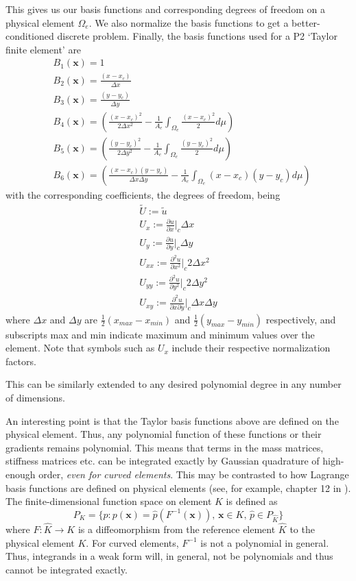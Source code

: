 \documentclass[11pt]{article}
\let\bld\boldsymbol
\begin{document}
This gives us our basis functions and corresponding degrees of freedom on a physical element $\Omega_e$. We also normalize the basis functions to get a better-conditioned discrete problem. Finally, the basis functions used for a P2 `Taylor finite element' are
\begin{align}
&B_1(\bld{x}) = 1 \\
&B_2(\bld{x}) = \frac{(x-x_c)}{\Delta x} \\
&B_3(\bld{x}) = \frac{(y-y_c)}{\Delta y} \\
&B_4(\bld{x}) = \left( \frac{(x-x_c)^2}{2\Delta x^2} - \frac{1}{A_e}\int_{\Omega_e} \frac{(x-x_c)^2}{2}d\mu \right) \\
&B_5(\bld{x}) = \left( \frac{(y-y_c)^2}{2\Delta y^2} -\frac{1}{A_e}\int_{\Omega_e} \frac{(y-y_c)^2}{2}d\mu \right) \\
&B_6(\bld{x}) = \left( \frac{(x-x_c)(y-y_c)}{\Delta x\Delta y} - \frac{1}{A_e}\int_{\Omega_e} (x-x_c)(y-y_c)d\mu \right)
\end{align}
with the corresponding coefficients, the degrees of freedom, being
\begin{align}
\tilde{U} := \tilde{u} \\
U_x := \frac{\partial u}{\partial x}\Big|_c \Delta x \\
U_y := \frac{\partial u}{\partial y}\Big|_c \Delta y \\
U_{xx} := \frac{\partial^2 u}{\partial x^2}\Big|_c 2\Delta x^2 \\
U_{yy} := \frac{\partial^2 u}{\partial y^2}\Big|_c 2\Delta y^2 \\
U_{xy} := \frac{\partial^2 u}{\partial x\partial y}\Big|_c \Delta x\Delta y
\end{align}
where $\Delta x$ and $\Delta y$ are $\frac12 (x_{max}-x_{min})$ and $\frac12 (y_{max}-y_{min})$ respectively, and subscripts max and min indicate maximum and minimum values over the element. Note that symbols such as $U_x$ include their respective normalization factors.

This can be similarly extended to any desired polynomial degree in any number of dimensions.

An interesting point is that the Taylor basis functions above are defined on the physical element. Thus, any polynomial function of these functions or their gradients remains polynomial. This means that terms in the mass matrices, stiffness matrices etc. can be integrated exactly by Gaussian quadrature of high-enough order, \emph{even for curved elements}. This may be contrasted to how Lagrange basis functions are defined on physical elements (see, for example, chapter 12 in \cite{claesjohnson}). The finite-dimensional function space on element $K$ is defined as
\begin{equation}
P_K = \{ p: p(\bld{x}) = \hat{p}(F^{-1}(\bld{x})),\, \bld{x} \in K,\, \hat{p} \in P_{\hat{K}} \}
\end{equation}
where $F:\hat{K}\rightarrow K$ is a diffeomorphism from the reference element $\hat{K}$ to the physical element $K$. For curved elements, $F^{-1}$ is not a polynomial in general. Thus, integrands in a weak form will, in general, not be polynomials and thus cannot be integrated exactly.
\end{document}
